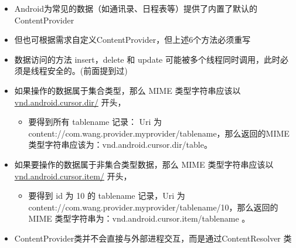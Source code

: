 \documentclass[9pt, b5paaper]{book}
\begin{document}
\begin{itemize}
\item Android为常见的数据（如通讯录、日程表等）提供了内置了默认的ContentProvider
\item 但也可根据需求自定义ContentProvider，但上述6个方法必须重写
\item 数据访问的方法 insert，delete 和 update 可能被多个线程同时调用，此时必须是线程安全的。(前面提到过)
\item 如果操作的数据属于集合类型，那么 MIME 类型字符串应该以 \uline{vnd.android.cursor.dir/} 开头，
\begin{itemize}
\item 要得到所有 tablename 记录： Uri 为 content://com.wang.provider.myprovider/tablename，那么返回的MIME类型字符串应该为：vnd.android.cursor.dir/table。
\end{itemize}
\item 如果要操作的数据属于非集合类型数据，那么 MIME 类型字符串应该以 \uline{vnd.android.cursor.item/} 开头，
\begin{itemize}
\item 要得到 id 为 10 的 tablename 记录，Uri 为 content://com.wang.provider.myprovider/tablename/10，那么返回的 MIME 类型字符串为：vnd.android.cursor.item/tablename 。
\end{itemize}

\item ContentProvider类并不会直接与外部进程交互，而是通过ContentResolver 类
\end{itemize}
\end{document}
